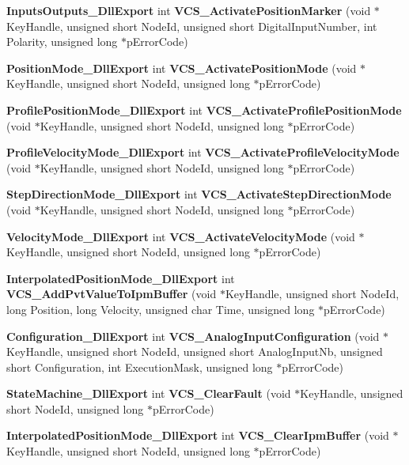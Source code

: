 \begin{DoxyCompactItemize}
\item 
{\bf \-Inputs\-Outputs\-\_\-\-Dll\-Export} int {\bf \-V\-C\-S\-\_\-\-Activate\-Position\-Marker} (void $\ast$\-Key\-Handle, unsigned short \-Node\-Id, unsigned short \-Digital\-Input\-Number, int \-Polarity, unsigned long $\ast$p\-Error\-Code)
\item 
{\bf \-Position\-Mode\-\_\-\-Dll\-Export} int {\bf \-V\-C\-S\-\_\-\-Activate\-Position\-Mode} (void $\ast$\-Key\-Handle, unsigned short \-Node\-Id, unsigned long $\ast$p\-Error\-Code)
\item 
{\bf \-Profile\-Position\-Mode\-\_\-\-Dll\-Export} int {\bf \-V\-C\-S\-\_\-\-Activate\-Profile\-Position\-Mode} (void $\ast$\-Key\-Handle, unsigned short \-Node\-Id, unsigned long $\ast$p\-Error\-Code)
\item 
{\bf \-Profile\-Velocity\-Mode\-\_\-\-Dll\-Export} int {\bf \-V\-C\-S\-\_\-\-Activate\-Profile\-Velocity\-Mode} (void $\ast$\-Key\-Handle, unsigned short \-Node\-Id, unsigned long $\ast$p\-Error\-Code)
\item 
{\bf \-Step\-Direction\-Mode\-\_\-\-Dll\-Export} int {\bf \-V\-C\-S\-\_\-\-Activate\-Step\-Direction\-Mode} (void $\ast$\-Key\-Handle, unsigned short \-Node\-Id, unsigned long $\ast$p\-Error\-Code)
\item 
{\bf \-Velocity\-Mode\-\_\-\-Dll\-Export} int {\bf \-V\-C\-S\-\_\-\-Activate\-Velocity\-Mode} (void $\ast$\-Key\-Handle, unsigned short \-Node\-Id, unsigned long $\ast$p\-Error\-Code)
\item 
{\bf \-Interpolated\-Position\-Mode\-\_\-\-Dll\-Export} \*
int {\bf \-V\-C\-S\-\_\-\-Add\-Pvt\-Value\-To\-Ipm\-Buffer} (void $\ast$\-Key\-Handle, unsigned short \-Node\-Id, long \-Position, long \-Velocity, unsigned char \-Time, unsigned long $\ast$p\-Error\-Code)
\item 
{\bf \-Configuration\-\_\-\-Dll\-Export} int {\bf \-V\-C\-S\-\_\-\-Analog\-Input\-Configuration} (void $\ast$\-Key\-Handle, unsigned short \-Node\-Id, unsigned short \-Analog\-Input\-Nb, unsigned short \-Configuration, int \-Execution\-Mask, unsigned long $\ast$p\-Error\-Code)
\item 
{\bf \-State\-Machine\-\_\-\-Dll\-Export} int {\bf \-V\-C\-S\-\_\-\-Clear\-Fault} (void $\ast$\-Key\-Handle, unsigned short \-Node\-Id, unsigned long $\ast$p\-Error\-Code)
\item 
{\bf \-Interpolated\-Position\-Mode\-\_\-\-Dll\-Export} \*
int {\bf \-V\-C\-S\-\_\-\-Clear\-Ipm\-Buffer} (void $\ast$\-Key\-Handle, unsigned short \-Node\-Id, unsigned long $\ast$p\-Error\-Code)
\item 

\end{DoxyCompactItemize}
